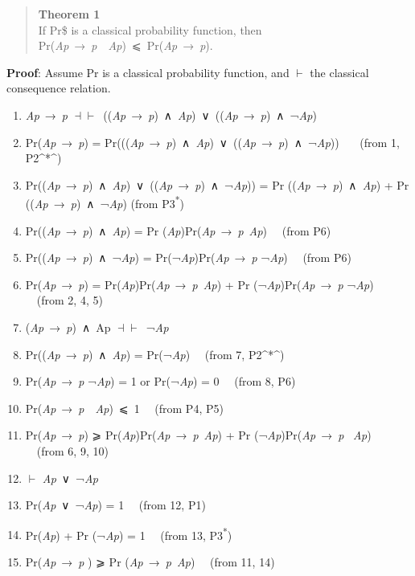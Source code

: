 \documentclass[
  11pt,
  letterpaper,
  DIV=11,
  numbers=noendperiod,
  twoside]{scrartcl}
\providecommand{\tightlist}{%
  \setlength{\itemsep}{0pt}\setlength{\parskip}{0pt}}
\begin{document}
\begin{quote}
\textbf{Theorem 1}\\
If Pr\$ is a classical probability function, then\\
Pr(\emph{Ap}~→~\emph{p}~\textbar~\emph{Ap})~⩽~Pr(\emph{Ap}~→~\emph{p}).
\end{quote}

\textbf{Proof}: Assume Pr is a classical probability function, and
\(\vdash\) the classical consequence relation.

\begin{enumerate}
\def\labelenumi{\arabic{enumi}.}
\tightlist
\item
  \emph{Ap}~→~\emph{p}
  \(\dashv \vdash\)~((\emph{Ap}~→~\emph{p})~∧~\emph{Ap})~∨~((\emph{Ap}~→~\emph{p})~∧~¬\emph{Ap})
\item
  Pr(\emph{Ap}~→~\emph{p}) =
  Pr(((\emph{Ap}~→~\emph{p})~∧~\emph{Ap})~∨~((\emph{Ap}~→~\emph{p})~∧~¬\emph{Ap}))
  ~~~(from 1, P2\^{}*\^{})
\item
  Pr((\emph{Ap}~→~\emph{p})~∧~\emph{Ap})~∨~((\emph{Ap}~→~\emph{p})~∧~¬\emph{Ap}))
  = Pr ((\emph{Ap}~→~\emph{p})~∧~\emph{Ap}) + Pr
  ((\emph{Ap}~→~\emph{p})~∧~¬\emph{Ap}) (from P3\textsuperscript{*})
\item
  Pr((\emph{Ap}~→~\emph{p})~∧~\emph{Ap}) = Pr
  (\emph{Ap})Pr(\emph{Ap}~→~\emph{p}\textbar~\emph{Ap}) ~~(from P6)
\item
  Pr((\emph{Ap}~→~\emph{p})~∧~¬\emph{Ap}) =
  Pr(¬\emph{Ap})Pr(\emph{Ap}~→~\emph{p} \textbar¬\emph{Ap}) ~~(from P6)
\item
  Pr(\emph{Ap}~→~\emph{p}) =
  Pr(\emph{Ap})Pr(\emph{Ap}~→~\emph{p}\textbar~\emph{Ap}) + Pr
  (¬\emph{Ap})Pr(\emph{Ap}~→~\emph{p} \textbar¬\emph{Ap}) ~~(from 2, 4,
  5)
\item
  (\emph{Ap}~→~\emph{p})~∧~Ap \(\dashv \vdash\)~¬\emph{Ap}
\item
  Pr((\emph{Ap}~→~\emph{p})~∧~\emph{Ap}) = Pr(¬\emph{Ap}) ~~(from 7,
  P2\^{}*\^{})
\item
  Pr(\emph{Ap}~→~\emph{p} \textbar¬\emph{Ap}) = 1 or Pr(¬\emph{Ap}) = 0
  ~~(from 8, P6)
\item
  Pr(\emph{Ap}~→~\emph{p}~\textbar~\emph{Ap})~⩽~1 ~~(from P4, P5)
\item
  Pr(\emph{Ap}~→~\emph{p}) ⩾
  Pr(\emph{Ap})Pr(\emph{Ap}~→~\emph{p}\textbar~\emph{Ap}) + Pr
  (¬\emph{Ap})Pr(\emph{Ap}~→~\emph{p} \textbar~\emph{Ap}) ~~(from 6, 9,
  10)
\item
  \(\vdash\) \emph{Ap}~∨~¬\emph{Ap} ~~
\item
  Pr(\emph{Ap}~∨~¬\emph{Ap}) = 1 ~~(from 12, P1)
\item
  Pr(\emph{Ap}) + Pr (¬\emph{Ap}) = 1 ~~(from 13, P3\textsuperscript{*})
\item
  Pr(\emph{Ap}~→~\emph{p} ) ⩾ Pr
  (\emph{Ap}~→~\emph{p}\textbar~\emph{Ap}) ~~(from 11, 14)
\end{enumerate}
\end{document}
